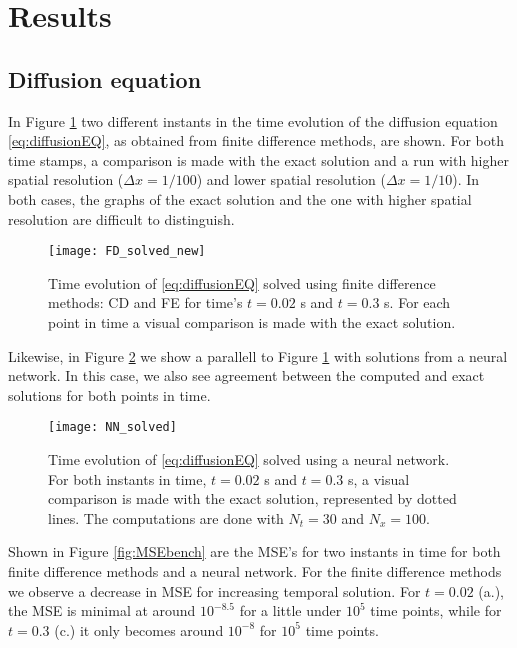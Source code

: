 \section{Results}
\label{sec:results}

\subsection{Diffusion equation}

In Figure \ref{fig:FDcompare} two different instants in the time evolution of the diffusion equation \eqref{eq:diffusionEQ}, as obtained from finite difference methods, are shown. For both time stamps, a comparison is made with the exact solution and a run with higher spatial resolution ($\Delta x = 1/100$) and lower spatial resolution ($\Delta x = 1/10$). In both cases, the graphs of the exact solution and the one with higher spatial resolution are difficult to distinguish.
 \begin{figure}[htbp]
  	\centering
  	\texttt{[image: FD\_solved\_new]}
  	\caption{Time evolution of \eqref{eq:diffusionEQ} solved using finite difference methods: CD and FE for time's $t=0.02$ s and $t=0.3$ s. For each point in time a visual comparison is made with the exact solution.}
   \label{fig:FDcompare}
 \end{figure}

Likewise, in Figure \ref{fig:NNcompare} we show a parallell to Figure \ref{fig:FDcompare} with solutions from a neural network. In this case, we also see agreement between the computed and exact solutions for both points in time.
 \begin{figure}[htbp]
  	\centering
  	\texttt{[image: NN\_solved]}
  	\caption{Time evolution of \eqref{eq:diffusionEQ} solved using a neural network. For both instants in time, $t=0.02$ s and $t=0.3$ s, a visual comparison is made with the exact solution, represented by dotted lines. The computations are done with $N_t = 30$ and $N_x = 100$.}
   \label{fig:NNcompare}
 \end{figure}

Shown in Figure \ref{fig:MSEbench} are the MSE's for two instants in time for both finite difference methods and a neural network. For the finite difference methods we observe a decrease in MSE for increasing temporal solution. For $t=0.02$ (a.), the MSE is minimal at around $10^{-8.5}$ for a little under $10^5$ time points, while for $t=0.3$ (c.) it only becomes around $10^{-8}$ for $10^5$ time points.

